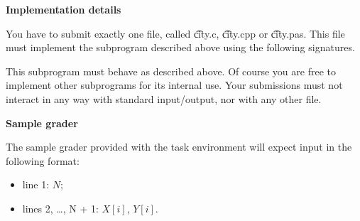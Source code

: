 \bf{Implementation details}

You have to submit exactly one file, called \t{city.c}, \t{city.cpp} or \t{city.pas}. This file must implement the subprogram described above using the following signatures.

This subprogram must behave as described above. Of course you are free to implement other subprograms for its internal use. Your submissions must not interact in any way with standard input/output, nor with any other file.

\bf{Sample grader}

The sample grader provided with the task environment will expect input in the following format:

\begin{itemize}
\item line 1: $N$;
\item lines 2, \ldots, N + 1: $X[i]$, $Y[i]$.
\end{itemize}

